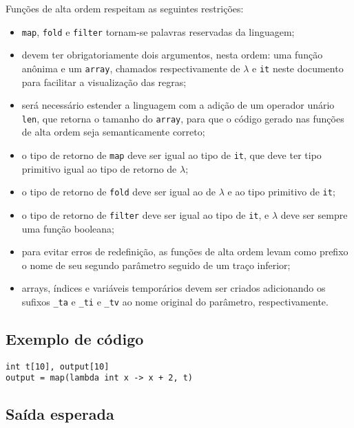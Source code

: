 \documentclass{article}
\newenvironment{smallitem}{
    \vspace{-1mm}
    \begin{itemize}
    \setlength{\parskip}{0pt}
    \setlength{\itemsep}{2pt}
}{
    \vspace{-2mm}
    \end{itemize}
}
\begin{document}
Funções de alta ordem respeitam as seguintes restrições:
\begin{smallitem}
    \item \texttt{map}, \texttt{fold} e \texttt{filter} tornam-se palavras
        reservadas da linguagem;
    \item devem ter obrigatoriamente dois argumentos, nesta ordem: uma função
        anônima e um \texttt{array}, chamados respectivamente
        de \texttt{$\lambda$} e \texttt{it} neste documento para facilitar a
        visualização das regras;
    \item será necessário estender a linguagem com a adição de um operador
        unário \texttt{len}, que retorna o tamanho do \texttt{array}, para que
        o código gerado nas funções de alta ordem seja semanticamente correto;
    \item o tipo de retorno de \texttt{map} deve ser igual ao tipo de
        \texttt{it}, que deve ter tipo primitivo igual ao tipo de retorno
        de \texttt{$\lambda$};
    \item o tipo de retorno de \texttt{fold} deve ser igual ao de
        \texttt{$\lambda$} e ao tipo primitivo de \texttt{it};
    \item o tipo de retorno de \texttt{filter} deve ser igual ao tipo de
        \texttt{it}, e \texttt{$\lambda$} deve ser sempre uma função booleana;
    \item para evitar erros de redefinição, as funções de alta ordem
        levam como prefixo o nome de seu segundo parâmetro seguido de
        um traço inferior;
    \item arrays, índices e variáveis temporários devem ser criados
        adicionando os sufixos \texttt{\_ta} e \texttt{\_ti} e \texttt{\_tv}
        ao nome original do parâmetro, respectivamente.
\end{smallitem}

\subsection{Exemplo de código}

\begin{verbatim}
int t[10], output[10]
output = map(lambda int x -> x + 2, t)
\end{verbatim}

\subsection{Saída esperada}
\end{document}
